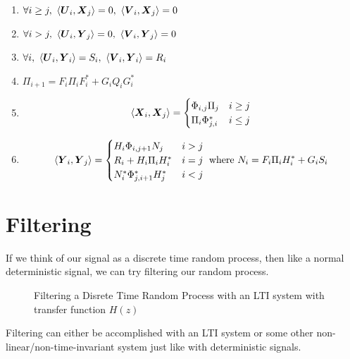 \begin{enumerate}
	\item $\forall i \geq j,\ \ip{\bs{U}_i}{\bs{X}_j} = 0,\ \ip{\bs{V}_i}{\bs{X}_j} = 0$
	\item $\forall i > j,\ \ip{\bs{U}_i}{\bs{Y}_j} = 0,\ \ip{\bs{V}_i}{\bs{Y}_j} = 0$
	\item $\forall i,\ \langle \boldsymbol{U}_i, \boldsymbol{Y}_i \rangle = S_i,\ \langle \boldsymbol{V}_i, \boldsymbol{Y}_i \rangle = R_i$
	\item $\Pi_{i+1} = F_i\Pi_iF_i^* + G_iQ_iG_i^*$
	\item \[
			\langle \boldsymbol{X}_i, \boldsymbol{X}_j \rangle = \begin{cases}
				\Phi_{i,j}\Pi_j & i \geq j \\
				\Pi_i \Phi_{j,i}^* & i \leq j
			\end{cases}
		\]
	\item \[
			\langle \boldsymbol{Y}_i, \boldsymbol{Y}_j \rangle = \begin{cases} 
				H_i \Phi_{i,j+1}N_j & i > j\\ 
				R_i + H_i\Pi_iH_i^* & i=j \\ 
				N_i^*\Phi^*_{j,i+1}H_j^* & i < j
			\end{cases} \text{ where } N_i=F_i\Pi_iH_i^*+G_iS_i
		\]
\end{enumerate}
\section{Filtering}
If we think of our signal as a discrete time random process, then like a normal deterministic signal, we can try filtering our random process.
\begin{gitbook-image}
\begin{figure}[!h]
  \centering
	\caption{Filtering a Disrete Time Random Process with an LTI system with transfer function $H(z)$}
  \label{fig:lti-filtering}
\end{figure}
\end{gitbook-image}
Filtering can either be accomplished with an LTI system or some other non-linear/non-time-invariant system just like with deterministic signals.
